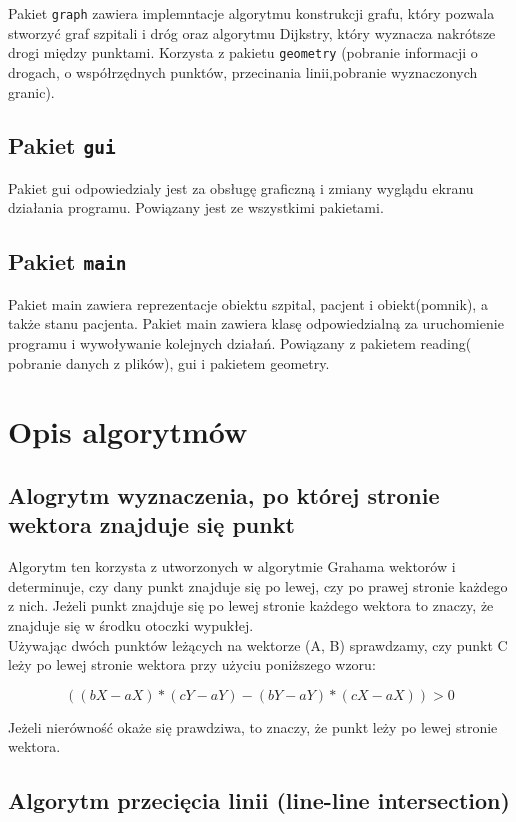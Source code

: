 \documentclass{article}
\begin{document}
Pakiet \texttt{graph} zawiera implemntacje algorytmu konstrukcji grafu, który pozwala stworzyć graf szpitali i dróg oraz algorytmu Dijkstry, który wyznacza nakrótsze drogi między punktami. Korzysta z pakietu  \texttt{geometry} (pobranie informacji o drogach, o współrzędnych punktów, przecinania linii,pobranie wyznaczonych granic).

\subsection{Pakiet \texttt{gui}}

Pakiet gui odpowiedzialy jest za obsługę graficzną i zmiany wyglądu ekranu działania programu. Powiązany jest ze wszystkimi pakietami.

\subsection{ Pakiet \texttt{main}}

Pakiet main zawiera reprezentacje obiektu szpital, pacjent i obiekt(pomnik), a także  stanu pacjenta. Pakiet main zawiera klasę odpowiedzialną za uruchomienie programu i wywoływanie kolejnych działań. Powiązany z pakietem reading( pobranie danych z plików), gui i pakietem geometry.


\pagebreak
\section{Opis algorytmów}
\subsection{Alogrytm wyznaczenia, po której stronie wektora znajduje się punkt}
\label{algo_whichside}
Algorytm ten korzysta z utworzonych w algorytmie Grahama wektorów i determinuje, czy dany punkt znajduje się po lewej, czy po prawej stronie każdego z nich. Jeżeli punkt znajduje się po lewej stronie każdego wektora to znaczy, że znajduje się w środku otoczki wypukłej. \\
Używając dwóch punktów leżących na wektorze (A, B) sprawdzamy, czy punkt C leży po lewej stronie wektora przy użyciu poniższego wzoru:

     $${((bX - aX)*(cY - aY) - (bY - aY)*(cX - aX)) > 0}$$

Jeżeli nierówność okaże się prawdziwa, to znaczy, że punkt leży po lewej stronie wektora.

\subsection{Algorytm przecięcia linii (line-line intersection)}
\label{algo_lineline}
    
\end{document}
